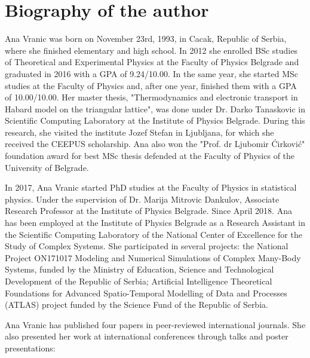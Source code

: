
\normalsize

\chapter{Biography of the author}

Ana Vranic was born on November 23rd, 1993, in Cacak, Republic of Serbia, where she finished elementary and high school. In 2012 she enrolled BSc studies of Theoretical and Experimental Physics at the Faculty of Physics Belgrade and graduated in 2016 with a GPA of 9.24/10.00. In the same year, she started MSc studies at the Faculty of Physics and, after one year, finished them with a GPA of 10.00/10.00. Her master thesis, "Thermodynamics and electronic transport in Habard model on the triangular lattice", was done under Dr. Darko Tanaskovic in Scientific Computing Laboratory at the Institute of Physics Belgrade. During this research, she visited the institute Jozef Stefan in Ljubljana, for which she received the CEEPUS scholarship. Ana also won the "Prof. dr Ljubomir Ćirković" foundation award for best MSc thesis defended at the Faculty of Physics of the University of Belgrade.

In 2017, Ana Vranic started PhD studies at the Faculty of Physics in statistical physics. Under the supervision of Dr. Marija Mitrovic Dankulov, Associate Research Professor at the Institute of Physics Belgrade. Since April 2018. Ana has been employed at the Institute of Physics Belgrade as a Research Assistant in the Scientific Computing Laboratory of the National Center of Excellence for the Study of Complex Systems. She participated in several projects:  the National Project ON171017 Modeling and Numerical Simulations of Complex Many-Body Systems, funded by the Ministry of Education, Science and Technological Development of the Republic of Serbia; Artificial Intelligence Theoretical Foundations for Advanced Spatio-Temporal Modelling of Data and Processes (ATLAS) project funded by the Science Fund of the Republic of Serbia. 

Ana Vranic has published four papers in peer-reviewed international journals. She also presented her work at international conferences through talks and poster presentations:

